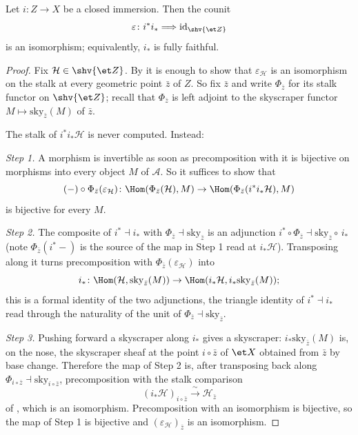 \begin{proposition}
\label{prop:openclosed-lowerStar-fully-faithful}
\leanok
Let $i\colon Z\to X$ be a closed immersion.  Then the counit
\[
  \varepsilon\colon i^*i_*\Longrightarrow\mathrm{id}_{\shv{\et Z}}
\]
is an isomorphism; equivalently, $i_*$ is fully faithful.
\end{proposition}
\begin{proof}
\leanok
Fix $\mathcal H\in\shv{\et Z}$.  By  it is
enough to show that $\varepsilon_{\mathcal H}$ is an isomorphism on the stalk
at every geometric point $\bar z$ of $Z$.  So fix $\bar z$ and write
$\Phi_{\bar z}$ for its stalk functor on $\shv{\et Z}$; recall that
$\Phi_{\bar z}$ is left adjoint to the skyscraper functor
$M\mapsto\mathrm{sky}_{\bar z}(M)$ of $\bar z$.

The stalk of $i^*i_*\mathcal H$ is never computed.  Instead:

\emph{Step 1.}  A morphism is invertible as soon as precomposition with it is
bijective on morphisms into every object $M$ of $\mathcal A$.  So it suffices
to show that
\[
  (-)\circ\Phi_{\bar z}(\varepsilon_{\mathcal H})\colon
  \Hom(\Phi_{\bar z}(\mathcal H),M)\to
  \Hom(\Phi_{\bar z}(i^*i_*\mathcal H),M)
\]
is bijective for every $M$.

\emph{Step 2.}  The composite of $i^*\dashv i_*$ with
$\Phi_{\bar z}\dashv\mathrm{sky}_{\bar z}$ is an adjunction
$i^*\circ\Phi_{\bar z}\dashv\mathrm{sky}_{\bar z}\circ\,i_*$ (note
$\Phi_{\bar z}(i^*-)$ is the source of the map in Step 1 read at
$i_*\mathcal H$).  Transposing along it turns precomposition with
$\Phi_{\bar z}(\varepsilon_{\mathcal H})$ into
\[
  i_*\colon
  \Hom(\mathcal H,\mathrm{sky}_{\bar z}(M))\to
  \Hom(i_*\mathcal H,i_*\mathrm{sky}_{\bar z}(M));
\]
this is a formal identity of the two adjunctions, the triangle identity of
$i^*\dashv i_*$ read through the naturality of the unit of
$\Phi_{\bar z}\dashv\mathrm{sky}_{\bar z}$.

\emph{Step 3.}  Pushing forward a skyscraper along $i_*$ gives a skyscraper:
$i_*\mathrm{sky}_{\bar z}(M)$ is, on the nose, the skyscraper sheaf at the
point $i\circ\bar z$ of $\et X$ obtained from $\bar z$ by base change.
Therefore the map of Step 2 is, after transposing back along
$\Phi_{i\circ\bar z}\dashv\mathrm{sky}_{i\circ\bar z}$, precomposition with
the stalk comparison
\[
  (i_*\mathcal H)_{i\circ\bar z}\xrightarrow{\ \sim\ }\mathcal H_{\bar z}
\]
of , which is an isomorphism.
Precomposition with an isomorphism is bijective, so the map of Step 1 is
bijective and $(\varepsilon_{\mathcal H})_{\bar z}$ is an isomorphism.


\end{proof}
